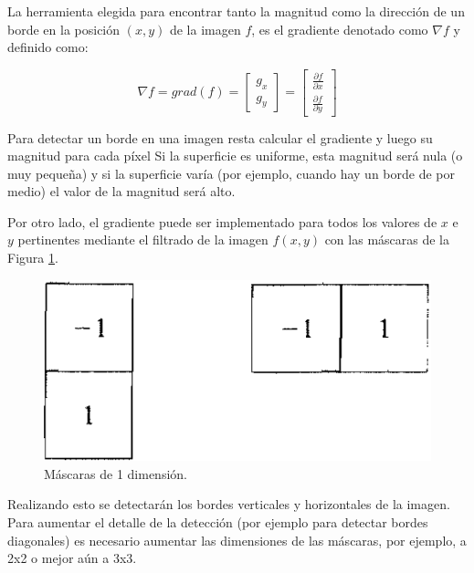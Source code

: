 La herramienta elegida para encontrar tanto la magnitud como la dirección de un borde en la posición $(x,y)$ de la imagen $f$, es el gradiente denotado como ${\nabla}f$ y definido como:

 \begin{equation}
{\nabla}f = grad(f) = \begin{bmatrix}
            {g_x} \\[0.3em]
            {g_y}
            \end{bmatrix} = \begin{bmatrix}
                    {\frac{{\partial}f}{{\partial}x}} \\[0.3em]
                    {\frac{{\partial}f}{{\partial}y}}
                      \end{bmatrix}
 \end{equation}

Para detectar un borde en una imagen resta calcular el gradiente y luego su magnitud para cada píxel Si la superficie es uniforme, esta magnitud será nula (o muy pequeña) y si la superficie varía (por ejemplo, cuando hay un borde de por medio) el valor de la magnitud será alto.

Por otro lado, el gradiente puede ser implementado para todos los valores de $x$ e $y$ pertinentes mediante el filtrado de la imagen $f(x,y)$ con las máscaras de la Figura \ref{matrix1d}.

\begin{figure}[H]
\begin{center}
\includegraphics[scale=0.3]{img/matriz1d.png}
\end{center}
\caption{Máscaras de 1 dimensión.}
\label{matrix1d}
\end{figure}

Realizando esto se detectarán los bordes verticales y horizontales de la imagen. Para aumentar el detalle de la detección (por ejemplo para detectar bordes diagonales) es necesario aumentar las dimensiones de las máscaras, por ejemplo, a 2x2 o mejor aún a 3x3.


